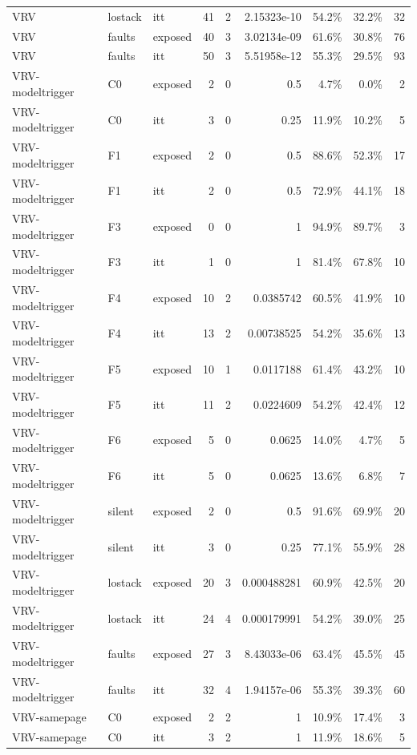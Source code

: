 \begin{tabular}{lllrrrrrr}
VRV & lostack & itt & 41 & 2 & 2.15323e-10 & 54.2\% & 32.2\% & 32 \\
VRV & faults & exposed & 40 & 3 & 3.02134e-09 & 61.6\% & 30.8\% & 76 \\
VRV & faults & itt & 50 & 3 & 5.51958e-12 & 55.3\% & 29.5\% & 93 \\
VRV-modeltrigger & C0 & exposed & 2 & 0 & 0.5 & 4.7\% & 0.0\% & 2 \\
VRV-modeltrigger & C0 & itt & 3 & 0 & 0.25 & 11.9\% & 10.2\% & 5 \\
VRV-modeltrigger & F1 & exposed & 2 & 0 & 0.5 & 88.6\% & 52.3\% & 17 \\
VRV-modeltrigger & F1 & itt & 2 & 0 & 0.5 & 72.9\% & 44.1\% & 18 \\
VRV-modeltrigger & F3 & exposed & 0 & 0 & 1 & 94.9\% & 89.7\% & 3 \\
VRV-modeltrigger & F3 & itt & 1 & 0 & 1 & 81.4\% & 67.8\% & 10 \\
VRV-modeltrigger & F4 & exposed & 10 & 2 & 0.0385742 & 60.5\% & 41.9\% & 10 \\
VRV-modeltrigger & F4 & itt & 13 & 2 & 0.00738525 & 54.2\% & 35.6\% & 13 \\
VRV-modeltrigger & F5 & exposed & 10 & 1 & 0.0117188 & 61.4\% & 43.2\% & 10 \\
VRV-modeltrigger & F5 & itt & 11 & 2 & 0.0224609 & 54.2\% & 42.4\% & 12 \\
VRV-modeltrigger & F6 & exposed & 5 & 0 & 0.0625 & 14.0\% & 4.7\% & 5 \\
VRV-modeltrigger & F6 & itt & 5 & 0 & 0.0625 & 13.6\% & 6.8\% & 7 \\
VRV-modeltrigger & silent & exposed & 2 & 0 & 0.5 & 91.6\% & 69.9\% & 20 \\
VRV-modeltrigger & silent & itt & 3 & 0 & 0.25 & 77.1\% & 55.9\% & 28 \\
VRV-modeltrigger & lostack & exposed & 20 & 3 & 0.000488281 & 60.9\% & 42.5\% & 20 \\
VRV-modeltrigger & lostack & itt & 24 & 4 & 0.000179991 & 54.2\% & 39.0\% & 25 \\
VRV-modeltrigger & faults & exposed & 27 & 3 & 8.43033e-06 & 63.4\% & 45.5\% & 45 \\
VRV-modeltrigger & faults & itt & 32 & 4 & 1.94157e-06 & 55.3\% & 39.3\% & 60 \\
VRV-samepage & C0 & exposed & 2 & 2 & 1 & 10.9\% & 17.4\% & 3 \\
VRV-samepage & C0 & itt & 3 & 2 & 1 & 11.9\% & 18.6\% & 5 \\

\end{tabular}
